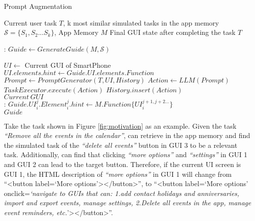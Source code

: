 \begin{algorithm}
\footnotesize
	\caption{Prompt Augmentation}
	\label{algo:prompt-augmenting}
	\begin{algorithmic}[1]
		\Require Current user task $T$, k most similar simulated tasks in the app memory $\mathcal{S}=\{S_1, S_2... S_k\}$, App Memory $M$ %
		\Ensure Final GUI state after completing the task $T$
		
		:
			\State $Guide \gets GenerateGuide(M, \mathcal{S})$
			
				\State $UI \gets$ Current GUI of SmartPhone
					\State $UI.elements.hint \gets Guide.UI.elements.Function$ %
				\EndIf
				\State $Prompt \gets PromptGenerator(T, UI, History)$
				\State $Action \gets LLM(Prompt)$
                    \State $TaskExecutor.execute(Action)$
				\State $History.insert(Action)$
			\EndWhile \\
		\Return $Current \ GUI$
		\EndFunction\\
		
		: 
                        \State $Guide.UI_i^{j}.Element_i^{j}.hint \gets M.Function\{UI_{i}^{j+1,j+2...}\}$
				\EndFor
			\EndFor \\
		\Return $Guide$ 
		\EndFunction
	\end{algorithmic}
\end{algorithm}

Take the task shown in Figure \ref{fig:motivation} as an example. Given the task \textit{``Remove all the events in the calendar''}, \name can retrieve in the app memory and find the simulated task of the \textit{``delete all events''} button in GUI 3 to be a relevant task. Additionally, \name can find that clicking \textit{``more options''} and \textit{``settings''} in GUI 1 and GUI 2 can lead to the target button. 
Therefore, if the current UI screen is GUI 1, %
the HTML description of \textit{``more options''} in GUI 1 will change from
``<button label=`More options'></button>'', to
``<button label=`More options' onclick=\textit{`navigate to GUIs that can: 1.add contact holidays and anniversaries, import and export events, manage settings, 2.Delete all events in the app, manage event reminders, etc.}'></button>''.

